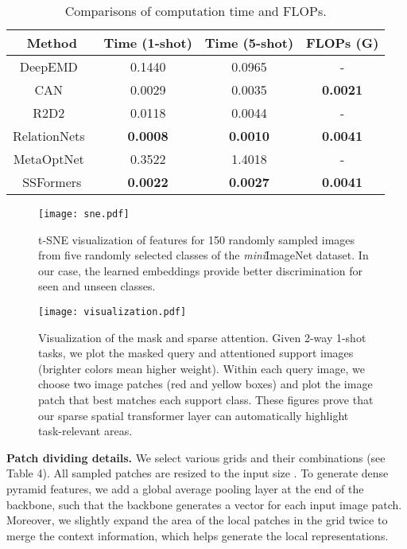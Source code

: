 \documentclass{SCIS2019}
\begin{document}
	\begin{table*}[h]
		\caption{Comparisons of computation time and FLOPs.}
		\centering
		\begin{tabular*}{\hsize}{@{}@{\extracolsep{\fill}}cccc@{}}
			\toprule
			\label{flops}
			Method  &Time (1-shot)
			&Time (5-shot)
			&FLOPs (G) \\
			\midrule
			DeepEMD~\cite{13}&0.1440&0.0965&-\\
			CAN~\cite{14}&0.0029&0.0035&\textbf{0.0021}\\
			R2D2~\cite{23}&0.0118&0.0044&-\\ 
			RelationNets~\cite{8}&\textbf{0.0008} &\textbf{0.0010}&\textbf{0.0041} \\
			MetaOptNet~\cite{29}&0.3522&1.4018& -\\
			SSFormers&\textbf{0.0022}  &\textbf{0.0027}& \textbf{0.0041} \\
			\bottomrule
			\bottomrule
		\end{tabular*}
	\end{table*}
	
	\begin{figure}[t]
		\centering
		\texttt{[image: sne.pdf]} \caption{t-SNE visualization of features for 150 randomly sampled images from five randomly selected classes of the \emph{mini}ImageNet dataset. In our case, the learned embeddings provide better discrimination for seen and unseen classes.}
	\end{figure}
	\begin{figure*}[t]
		\centering
		\texttt{[image: visualization.pdf]} \caption{Visualization of the mask and sparse attention. Given 2-way 1-shot tasks, we plot the masked query and attentioned support images (brighter colors mean higher weight). Within each query image, we choose two image patches (red and yellow boxes) and plot the image patch that best matches each support class. These figures prove that our sparse spatial transformer layer can automatically highlight task-relevant areas.}
	\end{figure*}

\textbf{Patch dividing details.} We select various grids and their combinations (see Table 4). All sampled patches are resized to the input size . To generate dense pyramid features, we add a global average pooling layer at the end of the backbone, such that the backbone generates a vector for each input image patch. Moreover, we slightly expand the area of the local patches in the grid twice to merge the context information, which helps generate the local representations. 
\end{document}
